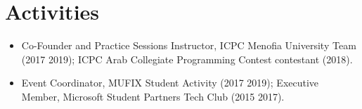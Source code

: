 \documentclass[10pt,a4paper]{article}
\begin{document}
\section{Activities}
\begin{itemize}
  \item Co-Founder and Practice Sessions Instructor, ICPC Menofia University Team (2017 \textendash{} 2019); ICPC Arab
        Collegiate Programming Contest contestant (2018).
  \item Event Coordinator, MUFIX Student Activity (2017 \textendash{} 2019); Executive Member, Microsoft Student Partners Tech Club (2015 \textendash{} 2017).
\end{itemize}
\end{document}

